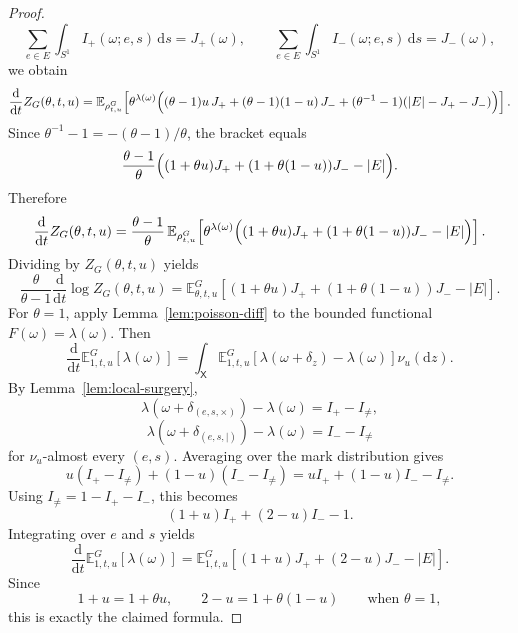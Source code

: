 \documentclass[10pt,a4paper]{amsart}
\newcommand{\Ebb}{\mathbb{E}}
\newcommand{\dd}{\mathrm{d}}
\begin{document}
\begin{proof}
\[
\sum_{e\in E}\int_{S^1} I_+(\omega;e,s)\,\dd s = J_+(\omega),
\qquad
\sum_{e\in E}\int_{S^1} I_-(\omega;e,s)\,\dd s = J_-(\omega),
\]
we obtain
\[
\frac{\dd}{\dd t}Z_G(\theta,t,u)
=
\Ebb_{\rho_{t,u}^G}\!\left[
\theta^{\lambda(\omega)}
\Bigl(
(\theta-1)u\,J_+
+
(\theta-1)(1-u)\,J_-
+
(\theta^{-1}-1)(|E|-J_+-J_-)
\Bigr)
\right].
\]
Since \(\theta^{-1}-1=-(\theta-1)/\theta\), the bracket equals
\[
\frac{\theta-1}{\theta}
\Bigl(
(1+\theta u)J_+ + (1+\theta(1-u))J_- - |E|
\Bigr).
\]
Therefore
\[
\frac{\dd}{\dd t}Z_G(\theta,t,u)
=
\frac{\theta-1}{\theta}\,
\Ebb_{\rho_{t,u}^G}\!\left[
\theta^{\lambda(\omega)}
\Bigl(
(1+\theta u)J_+ + (1+\theta(1-u))J_- - |E|
\Bigr)
\right].
\]
Dividing by \(Z_G(\theta,t,u)\) yields
\[
\frac{\theta}{\theta-1}\frac{\dd}{\dd t}\log Z_G(\theta,t,u)
=
\Ebb_{\theta,t,u}^G\!\left[
(1+\theta u)J_+ + (1+\theta(1-u))J_- - |E|
\right].
\]
For \(\theta=1\), apply Lemma~\ref{lem:poisson-diff} to the bounded functional
\(F(\omega)=\lambda(\omega)\). Then
\[
\frac{\dd}{\dd t}\Ebb_{1,t,u}^G[\lambda(\omega)]
=
\int_{\mathsf X}
\Ebb_{1,t,u}^G\!\left[
\lambda(\omega+\delta_z)-\lambda(\omega)
\right]\nu_u(\dd z).
\]
By Lemma~\ref{lem:local-surgery},
\[
\lambda(\omega+\delta_{(e,s,\times)})-\lambda(\omega)=I_+-I_{\neq},
\]
\[
\lambda(\omega+\delta_{(e,s,\mid)})-\lambda(\omega)=I_--I_{\neq}
\]
for \(\nu_u\)-almost every \((e,s)\). Averaging over the mark distribution gives
\[
u(I_+-I_{\neq})+(1-u)(I_--I_{\neq})
=
uI_+ + (1-u)I_- - I_{\neq}.
\]
Using \(I_{\neq}=1-I_+-I_-\), this becomes
\[
(1+u)I_+ + (2-u)I_- - 1.
\]
Integrating over \(e\) and \(s\) yields
\[
\frac{\dd}{\dd t}\Ebb_{1,t,u}^G[\lambda(\omega)]
=
\Ebb_{1,t,u}^G\!\left[
(1+u)J_+ + (2-u)J_- - |E|
\right].
\]
Since
\[
1+u=1+\theta u,
\qquad
2-u=1+\theta(1-u)
\qquad\text{when }\theta=1,
\]
this is exactly the claimed formula.
\end{proof}
\end{document}
